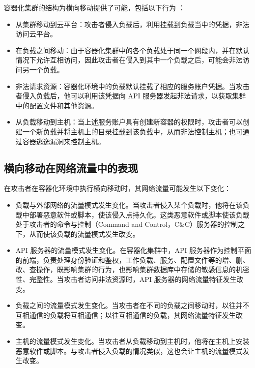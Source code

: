 {容器化集群的结构为横向移动提供了可能，包括以下行为 \citep{yossi2020threat}：

\begin{itemize}
    \item {从集群移动到云平台：攻击者侵入负载后，利用挂载到负载当中的凭据，非法访问云平台。}
    \item {在负载之间移动：由于容器化集群中的各个负载处于同一个网段内，并在默认情况下允许互相访问，因此攻击者在侵入到其中一个负载之后，可能会非法访问另一个负载。}
    \item {非法请求资源：容器化环境中的负载默认挂载了相应的服务账户凭据。当攻击者侵入负载后，他可以利用该凭据向 API 服务器发起非法请求，以获取集群中的配置文件和其他资源。}
    \item {从负载移动到主机：当上述服务账户具有创建新容器的权限时，攻击者可以创建一个新负载并将主机上的目录挂载到该负载中，从而非法控制主机；也可通过容器逃逸漏洞来控制主机。}
\end{itemize}




\subsection{横向移动在网络流量中的表现}

在攻击者在容器化环境中执行横向移动时，其网络流量可能发生以下变化：

\begin{itemize}
    \item 负载与外部网络的流量模式发生变化。当攻击者侵入某个负载时，他将在该负载中部署恶意软件或脚本，使该侵入点持久化。这类恶意软件或脚本使该负载处于攻击者的命令与控制（Command and Control，C\&C）服务器的控制之下，从而使该负载的流量模式发生改变。
    \item API 服务器的流量模式发生变化。在容器化集群中，API 服务器作为控制平面的前端，负责处理身份验证和鉴权，工作负载、服务、配置文件等的增、删、改、查操作，既影响集群的行为，也影响集群数据库中存储的敏感信息的机密性、完整性。当攻击者访问非法资源时，API 服务器的网络流量特征发生改变。
    \item 负载之间的流量模式发生变化。当攻击者在不同的负载之间移动时，以往并不互相通信的负载将互相通信；以往互相通信的负载，其网络流量特征发生改变。
    \item 主机的流量模式发生变化。当攻击者从负载移动到主机时，他将在主机上安装恶意软件或脚本。与攻击者侵入负载的情况类似，这也会让主机的流量模式发生改变。
\end{itemize}

}
